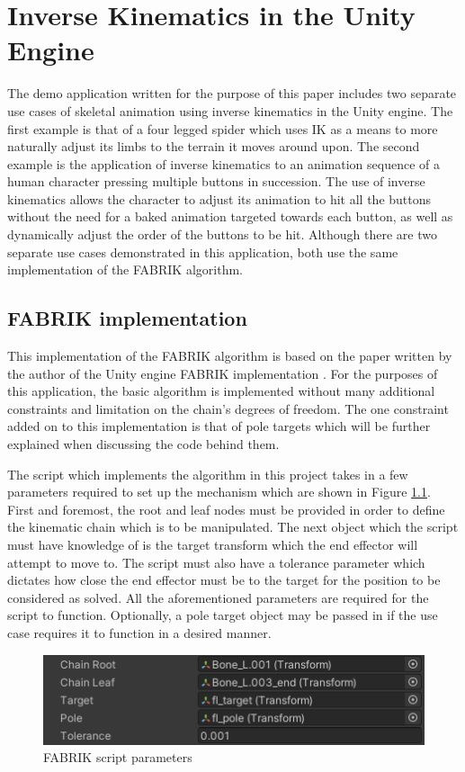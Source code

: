 \chapter{Inverse Kinematics in the Unity Engine} 
The demo application written for the purpose of this paper includes two separate
use cases of skeletal animation using inverse kinematics in the Unity engine.
The first example is that of a four legged spider which uses IK as a means to
more naturally adjust its limbs to the terrain it moves around upon. The second
example is the application of inverse kinematics to an animation sequence of
a human character pressing multiple buttons in succession. The use of inverse
kinematics allows the character to adjust its animation to hit all the buttons
without the need for a baked animation targeted towards each button, as well as
dynamically adjust the order of the buttons to be hit. Although there are two
separate use cases demonstrated in this application, both use the same
implementation of the FABRIK algorithm. 


\section{FABRIK implementation}
This implementation of the FABRIK algorithm is based on the paper written by the
author of the Unity engine FABRIK implementation \cite{Aristidou2011}. For the
purposes of this application, the basic algorithm is implemented without many
additional constraints and limitation on the chain's degrees of freedom. The one
constraint added on to this implementation is that of pole targets which will be
further explained when discussing the code behind them.

The script which implements the algorithm in this project takes in a few
parameters required to set up the mechanism which are shown in Figure
\ref{fig:params}. First and foremost, the root and leaf nodes must be provided
in order to define the kinematic chain which is to be manipulated. The next
object which the script must have knowledge of is the target transform which the
end effector will attempt to move to. The script must also have a tolerance
parameter which dictates how close the end effector must be to the target for
the position to be considered as solved. All the aforementioned parameters are
required for the script to function. Optionally, a pole target object may be
passed in if the use case requires it to function in a desired manner. 

\begin{figure}
    \centering
    \includegraphics{grafika/parametry_ik.png}
    \caption{FABRIK script parameters}
    \label{fig:params}
\end{figure}


